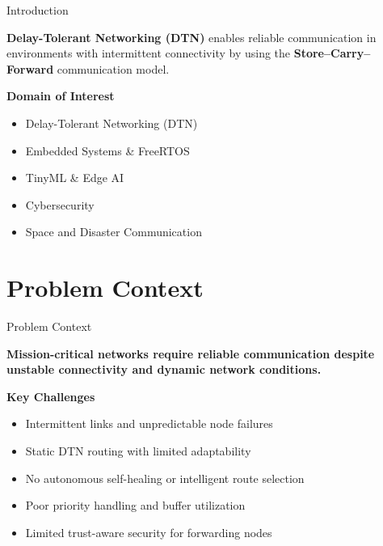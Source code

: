 \documentclass[11pt,aspectratio=43]{beamer}
\begin{document}
\begin{frame}{Introduction}

\textbf{Delay-Tolerant Networking (DTN)} enables reliable communication in environments with intermittent connectivity by using the \textbf{Store--Carry--Forward} communication model.

\vspace{0.3cm}

\textbf{Domain of Interest}

\begin{itemize}
    \item Delay-Tolerant Networking (DTN)
    \item Embedded Systems \& FreeRTOS
    \item TinyML \& Edge AI
    \item Cybersecurity
    \item Space and Disaster Communication
\end{itemize}

\end{frame}

\section{Problem Context}

\begin{frame}{Problem Context}

\textbf{Mission-critical networks require reliable communication despite unstable connectivity and dynamic network conditions.}

\vspace{0.3cm}

\textbf{Key Challenges}

\begin{itemize}
    \item Intermittent links and unpredictable node failures
    \item Static DTN routing with limited adaptability
    \item No autonomous self-healing or intelligent route selection
    \item Poor priority handling and buffer utilization
    \item Limited trust-aware security for forwarding nodes
\end{itemize}

\end{frame}
\end{document}
